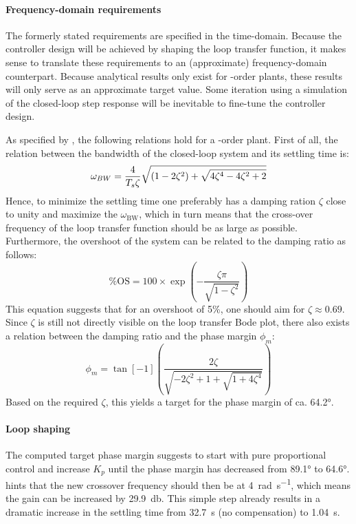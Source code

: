 \paragraph{Frequency-domain requirements}
The formerly stated requirements are specified in the time-domain. Because the controller design will be achieved by shaping the loop transfer function, it makes sense to translate these requirements to an (approximate) frequency-domain counterpart. Because analytical results only exist for -order plants, these results will only serve as an approximate target value. Some iteration using a simulation of the closed-loop step response will be inevitable to fine-tune the controller design.

As specified by \textcite{nise}, the following relations hold for a -order plant. First of all, the relation between the bandwidth of the closed-loop system and its settling time is:
\begin{equation}
    \omega_{BW} = \frac{4}{T_s\zeta}\sqrt{\qty(1 - 2\zeta^2)+\sqrt{4
    \zeta^4-4\zeta^2+2}}
    \label{eq:damping}
\end{equation}
Hence, to minimize the settling time one preferably has a damping ration $\zeta$ close to unity and maximize the $\omega_\text{BW}$, which in turn means that the cross-over frequency of the loop transfer function should be as large as possible. Furthermore, the overshoot of the system can be related to the damping ratio as follows:
\begin{equation}
\%\text{OS} = 100\times \exp(-\frac{\zeta \pi}{\sqrt{1-\zeta^2}})
\label{eq:overshoot}    
\end{equation}
This equation suggests that for an overshoot of 5\%, one should aim for $\zeta \approx 0.69$.
Since $\zeta$ is still not directly visible on the loop transfer Bode plot, there also exists a relation between the damping ratio and the phase margin $\phi_m$:
\begin{equation}
\phi_m = \tan[-1](\frac{2\zeta}{\sqrt{-2\zeta^2 + 1 + \sqrt{1 + 4\zeta^4}}})
\label{eq:settlingtime}    
\end{equation}
Based on the required $\zeta$, this yields a target for the phase margin of ca. \ang{64.2}.

\paragraph{Loop shaping}
The computed target phase margin suggests to start with pure proportional control and increase $K_p$ until the phase margin has decreased from \ang{89.1} to \ang{64.6}.  hints that the new crossover frequency should then be at \SI{4}{\radian\per\second}, which means the gain can be increased by \SI{29.9}{\decibel}. This simple step already results in a dramatic increase in the settling time from \SI{32.7}{\second} (no compensation) to \SI{1.04}{\second}. 


